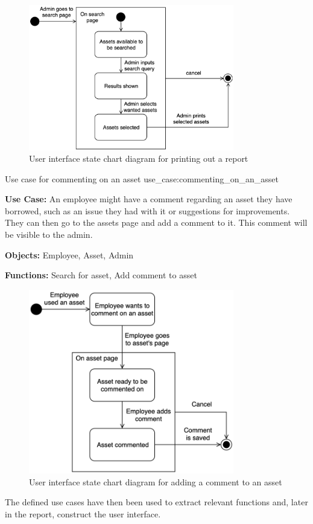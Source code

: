 \begin{figure}[H]
    \centering
    \includegraphics[width=0.8\textwidth]{figures/UC_Print_report.png}
    \caption{User interface state chart diagram for printing out a report}
    \label{fig:print_report_statechart}
\end{figure}

\newpage

    {Use case for commenting on an asset}
    {use_case:commenting_on_an_asset}
    {
        \textbf{Use Case:} An employee might have a comment regarding an asset they have borrowed, such as an issue they had with it or suggestions for improvements. They can then go to the assets page and add a comment to it. This comment will be visible to the admin. 
    
        \vskip 0.2cm
        
        \textbf{Objects:} Employee, Asset, Admin
        
        \vskip 0.2cm
        
        \textbf{Functions:} Search for asset, Add comment to asset
    }

\begin{figure}[H]
    \centering
    \includegraphics[width=0.8\textwidth]{figures/UC_Add_comment.png}
    \caption{User interface state chart diagram for adding a comment to an asset}
    \label{fig:add_comment_statechart}
\end{figure}

\par

The defined use cases have then been used to extract relevant functions and, later in the report, construct the user interface.
